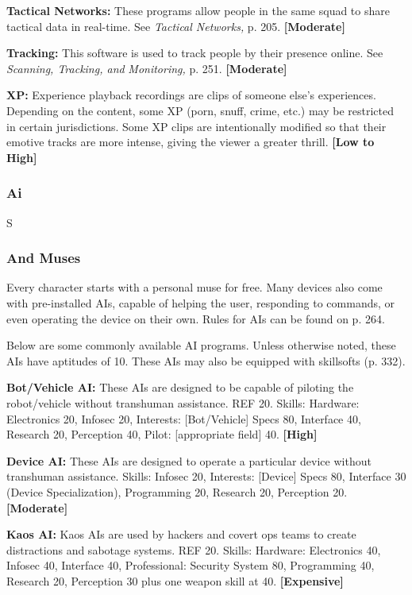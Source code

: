 \textbf{Tactical Networks:} These programs allow people in 
the same squad to share tactical data in real-time. See 
\textit{Tactical Networks,} p. 205. \textbf{[Moderate]}

\textbf{Tracking:} This software is used to track people by 
their presence online. See \textit{Scanning, Tracking, and }
\textit{Monitoring,} p. 251. \textbf{[Moderate]}

\textbf{XP:} Experience playback recordings are clips of 
someone else's experiences. Depending on the content, 
some XP (porn, snuff, crime, etc.) may be restricted in 
certain jurisdictions. Some XP clips are intentionally 
modified so that their emotive tracks are more intense, 
giving the viewer a greater thrill. \textbf{[Low to High]}

\subsubsection{Ai}


S

\subsubsection{ And Muses}

Every character starts with a personal muse for free. 
Many devices also come with pre-installed AIs, capable
of helping the user, responding to commands, or
even operating the device on their own. Rules for AIs 
can be found on p. 264.

Below are some commonly available AI programs. 
Unless otherwise noted, these AIs have aptitudes of 10. 
These AIs may also be equipped with skillsofts (p. 332).

\textbf{Bot/Vehicle AI:} These AIs are designed to be capable
of piloting the robot/vehicle without transhuman
assistance. REF 20. Skills: Hardware: Electronics 20, 
Infosec 20, Interests: [Bot/Vehicle] Specs 80, Interface 
40, Research 20, Perception 40, Pilot: [appropriate 
field] 40. \textbf{[High]}

\textbf{Device AI:} These AIs are designed to operate a particular
device without transhuman assistance. Skills:
Infosec 20, Interests: [Device] Specs 80, Interface 30 
(Device Specialization), Programming 20, Research 20, 
Perception 20. \textbf{[Moderate]}

\textbf{Kaos AI:} Kaos AIs are used by hackers and covert 
ops teams to create distractions and sabotage systems. 
REF 20. Skills: Hardware: Electronics 40, Infosec 40, 
Interface 40, Professional: Security System 80, Programming
40, Research 20, Perception 30 plus one
weapon skill at 40. \textbf{[Expensive]}

